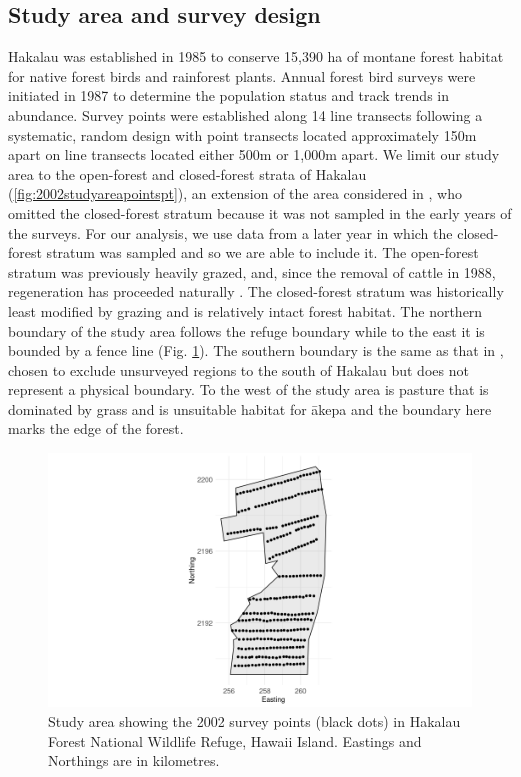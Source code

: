 \documentclass{statsoc}
\newcommand{\akepa}{\textquotesingle\={a}kepa}  %
\newcommand{\hawaii}{Hawai\textquotesingle i}   %
\begin{document}
\subsection{Study area and survey design}

Hakalau was established in 1985 to conserve 15,390 ha of montane forest habitat for native forest birds and rainforest plants. Annual forest bird surveys were initiated in 1987 to determine the population status and track trends in abundance. Survey points were established along 14 line transects following a systematic, random design with point transects located approximately 150m apart on line transects located either 500m or 1,000m apart. We limit our study area to the open-forest and closed-forest strata of Hakalau (\autoref{fig:2002studyareapointspt}), an extension of the area considered in \cite{camp_population_2010, camp_statespace_2016}, who omitted the closed-forest stratum because it was not sampled in the early years of the surveys.  For our analysis, we use data from a later year in which the closed-forest stratum was sampled and so we are able to include it.  The open-forest stratum was previously heavily grazed, and, since the removal of cattle in 1988, regeneration has proceeded naturally \citep{maxfield_hakalau_1998}. The closed-forest stratum was historically least modified by grazing and is relatively intact forest habitat.  The northern boundary of the study area follows the refuge boundary while to the east it is bounded by a fence line (Fig. \ref{fig:2002studyareapointspt}). The southern boundary is the same as that in \cite{camp_population_2010}, chosen to exclude unsurveyed regions to the south of Hakalau but does not represent a physical boundary. To the west of the study area is pasture that is dominated by grass and is unsuitable habitat for \akepa{} and the boundary here marks the edge of the forest.

\begin{figure}[!htb]
	\centering
	\includegraphics[scale=0.5]{figures/study_area_design.png}
	\caption{Study area showing the 2002 survey points (black dots) in Hakalau Forest National Wildlife Refuge, \hawaii{} Island.  Eastings and Northings are in kilometres.}
	\label{fig:2002studyareapointspt}
\end{figure}
\end{document}
